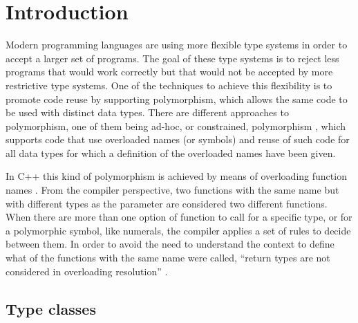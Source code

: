 \documentclass[msc]{ppgccufmg}
\begin{document}

\chapter{Introduction}
Modern programming languages are using more flexible type systems in order to accept a larger set of programs.
The goal of these type systems is to reject less programs that would work correctly but that would not be accepted by more restrictive type systems.
One of the techniques to achieve this flexibility is to promote code reuse by supporting polymorphism, which allows the same code to be used with distinct data types.
There are different approaches to polymorphism, one of them being ad-hoc, or constrained, polymorphism \citep{wadler}, which supports code that use overloaded names (or symbols) and reuse of such code for all data types for which a definition of the overloaded names have been given.

In C++ this kind of polymorphism is achieved by means of overloading function names \citep[section 7.4]{stroustrup}.
From the compiler perspective, two functions with the same name but with different types as the parameter are considered two different functions.
When there are more than one option of function to call for a specific type, or for a polymorphic symbol, like numerals, the compiler applies a set of rules to decide between them.
In order to avoid the need to understand the context to define what of the functions with the same name were called, ``return types are not considered in overloading resolution'' \citep[section 7.4.1]{stroustrup}.

\section{Type classes}
\end{document}

